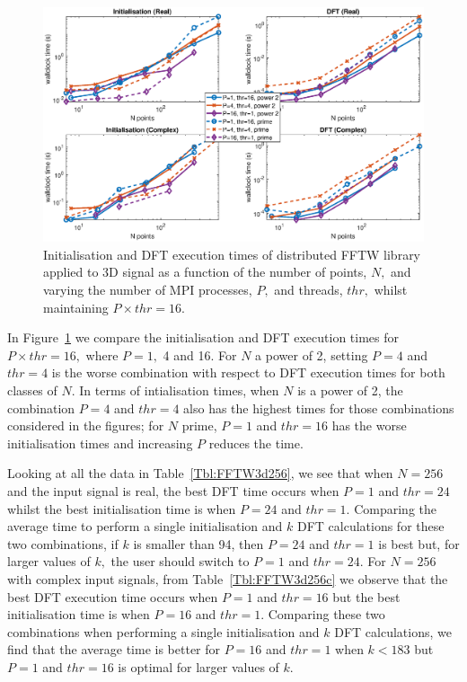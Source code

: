 \documentclass[a4paper]{article}
\begin{document}
\begin{figure}[htb]
    \centering
    \includegraphics[width=0.9\linewidth]{../results/fftw_3d_mpi_thr.eps}
  \caption{Initialisation and DFT execution times of distributed FFTW library applied to 3D signal as a function of the
    number of points, $N,$ and varying the number of MPI processes, $P,$ and threads, $thr,$ whilst maintaining $P\times thr=16.$}
  \label{3DDistFFTW16}
\end{figure}


In Figure~\ref{3DDistFFTW16} we compare the initialisation and DFT
execution times for $P\times thr=16,$ where $P=1,$ 4 and 16. For $N$ a
power of 2, setting $P=4$ and $thr=4$ is the worse combination with
respect to DFT execution times for both classes of $N.$ In terms of
intialisation times, when $N$ is a power of 2, the combination $P=4$
and $thr=4$ also has the highest times for those combinations
considered in the figures; for $N$ prime, $P=1$ and $thr=16$ has the
worse initialisation times and increasing $P$ reduces the time.

Looking at all the data in Table~\ref{Tbl:FFTW3d256}, we see that when
$N=256$ and the input signal is real, the best DFT time occurs when
$P=1$ and $thr=24$ whilst the best initialisation time is when $P=24$
and $thr=1.$ Comparing the average time to perform a single
initialisation and $k$ DFT calculations for these two combinations, if
$k$ is smaller than 94, then $P=24$ and $thr=1$ is best but, for larger
values of $k,$ the user should switch to $P=1$ and $thr=24.$ For
$N=256$ with complex input signals, from Table~\ref{Tbl:FFTW3d256c} we
observe that the best DFT execution time occurs when $P=1$ and
$thr=16$ but the best initialisation time is when $P=16$ and $thr=1.$
Comparing these two combinations when performing a single
initialisation and $k$ DFT calculations, we find that the average time
is better for $P=16$ and $thr=1$ when $k<183$ but $P=1$ and $thr=16$
is optimal for larger values of $k.$
\end{document}
